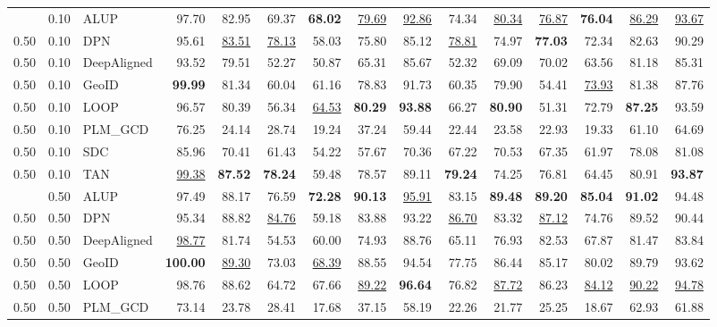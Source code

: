 \begin{table}[t]
{\begin{tabular}{lllrrrrrrrrrrrr}
\addlinespace
0.50 & 0.10 & ALUP & 97.70 & 82.95 & 69.37 & \textbf{68.02} & \underline{79.69} & \underline{92.86} & 74.34 & \underline{80.34} & \underline{76.87} & \textbf{76.04} & \underline{86.29} & \underline{93.67} \\
0.50 & 0.10 & DPN & 95.61 & \underline{83.51} & \underline{78.13} & 58.03 & 75.80 & 85.12 & \underline{78.81} & 74.97 & \textbf{77.03} & 72.34 & 82.63 & 90.29 \\
0.50 & 0.10 & DeepAligned & 93.52 & 79.51 & 52.27 & 50.87 & 65.31 & 85.67 & 52.32 & 69.09 & 70.02 & 63.56 & 81.18 & 85.31 \\
0.50 & 0.10 & GeoID & \textbf{99.99} & 81.34 & 60.04 & 61.16 & 78.83 & 91.73 & 60.35 & 79.90 & 54.41 & \underline{73.93} & 81.38 & 87.76 \\
0.50 & 0.10 & LOOP & 96.57 & 80.39 & 56.34 & \underline{64.53} & \textbf{80.29} & \textbf{93.88} & 66.27 & \textbf{80.90} & 51.31 & 72.79 & \textbf{87.25} & 93.59 \\
0.50 & 0.10 & PLM_GCD & 76.25 & 24.14 & 28.74 & 19.24 & 37.24 & 59.44 & 22.44 & 23.58 & 22.93 & 19.33 & 61.10 & 64.69 \\
0.50 & 0.10 & SDC & 85.96 & 70.41 & 61.43 & 54.22 & 57.67 & 70.36 & 67.22 & 70.53 & 67.35 & 61.97 & 78.08 & 81.08 \\
0.50 & 0.10 & TAN & \underline{99.38} & \textbf{87.52} & \textbf{78.24} & 59.48 & 78.57 & 89.11 & \textbf{79.24} & 74.25 & 76.81 & 64.45 & 80.91 & \textbf{93.87} \\
\addlinespace
0.50 & 0.50 & ALUP & 97.49 & 88.17 & 76.59 & \textbf{72.28} & \textbf{90.13} & \underline{95.91} & 83.15 & \textbf{89.48} & \textbf{89.20} & \textbf{85.04} & \textbf{91.02} & 94.48 \\
0.50 & 0.50 & DPN & 95.34 & 88.82 & \underline{84.76} & 59.18 & 83.88 & 93.22 & \underline{86.70} & 83.32 & \underline{87.12} & 74.76 & 89.52 & 90.44 \\
0.50 & 0.50 & DeepAligned & \underline{98.77} & 81.74 & 54.53 & 60.00 & 74.93 & 88.76 & 65.11 & 76.93 & 82.53 & 67.87 & 81.47 & 83.84 \\
0.50 & 0.50 & GeoID & \textbf{100.00} & \underline{89.30} & 73.03 & \underline{68.39} & 88.55 & 94.54 & 77.75 & 86.44 & 85.17 & 80.02 & 89.79 & 93.62 \\
0.50 & 0.50 & LOOP & 98.76 & 88.62 & 64.72 & 67.66 & \underline{89.22} & \textbf{96.64} & 76.82 & \underline{87.72} & 86.23 & \underline{84.12} & \underline{90.22} & \underline{94.78} \\
0.50 & 0.50 & PLM_GCD & 73.14 & 23.78 & 28.41 & 17.68 & 37.15 & 58.19 & 22.26 & 21.77 & 25.25 & 18.67 & 62.93 & 61.88 \\

\end{tabular}}
\end{table}
